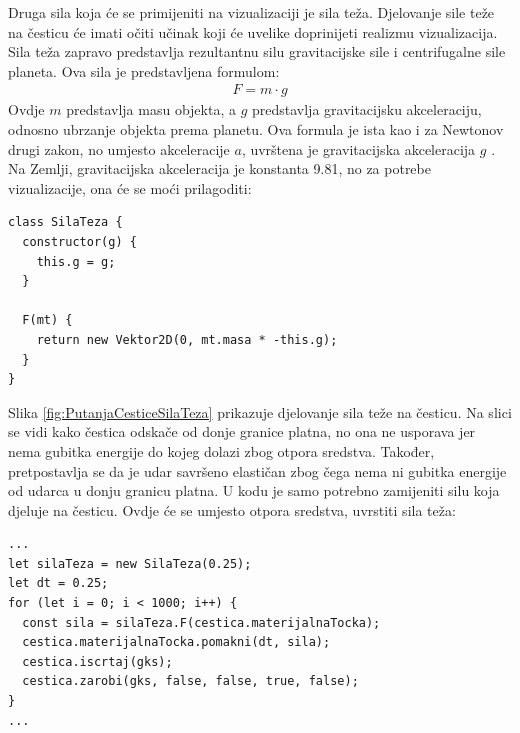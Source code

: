 \documentclass{foi}
\begin{document}
Druga sila koja će se primijeniti na vizualizaciji je sila teža. Djelovanje sile teže na česticu će imati očiti učinak koji će uvelike doprinijeti realizmu vizualizacija. Sila teža zapravo predstavlja rezultantnu silu gravitacijske sile i centrifugalne sile planeta. Ova sila je predstavljena formulom:
 \begin{align*}
F = m\cdot g
\end{align*}
Ovdje $m$ predstavlja masu objekta, a $g$ predstavlja gravitacijsku akceleraciju, odnosno ubrzanje objekta prema planetu. Ova formula je ista kao i za Newtonov drugi zakon, no umjesto akceleracije $a$, uvrštena je gravitacijska akceleracija $g$ \parencite{NASAWeightMass}. 
Na Zemlji, gravitacijska akceleracija je konstanta 9.81, no za potrebe vizualizacije, ona će se moći prilagoditi:
\begin{verbatim}
class SilaTeza {
  constructor(g) {
    this.g = g;
  }

  F(mt) {
    return new Vektor2D(0, mt.masa * -this.g);
  }
}
\end{verbatim}

Slika \ref{fig:PutanjaCesticeSilaTeza} prikazuje djelovanje sila teže na česticu. Na slici se vidi kako čestica odskače od donje granice platna, no ona ne usporava jer nema gubitka energije do kojeg dolazi zbog otpora sredstva. Također, pretpostavlja se da je udar savršeno elastičan zbog čega nema ni gubitka energije od udarca u donju granicu platna. U kodu je samo potrebno zamijeniti silu koja djeluje na česticu. Ovdje će se umjesto otpora sredstva, uvrstiti sila teža:

\begin{verbatim}
...
let silaTeza = new SilaTeza(0.25);
let dt = 0.25;
for (let i = 0; i < 1000; i++) {
  const sila = silaTeza.F(cestica.materijalnaTocka);
  cestica.materijalnaTocka.pomakni(dt, sila);
  cestica.iscrtaj(gks);
  cestica.zarobi(gks, false, false, true, false);
}
...
\end{verbatim}
\end{document}
